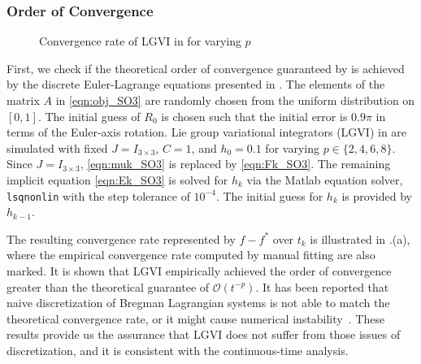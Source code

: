 \documentclass[letterpaper, 10pt, conference]{ieeeconf}
\newcommand{\bracket}[1]{\ensuremath{\left[ #1 \right]}}
\newcommand{\tr}[1]{\mbox{tr}\ensuremath{\negthickspace\bracket{#1}}}
\renewcommand{\L}{\ensuremath{\mathsf{L}}}
\renewcommand{\Re}{\ensuremath{\mathbb{R}}}
\newcommand{\D}{\ensuremath{\mathbf{D}}}
\begin{document}

\subsubsection{Order of Convergence}

\begin{figure}
    \centerline{
    }
    \centerline{
    }
    \caption{Convergence rate of LGVI in  for varying $p$}\label{fig:conv}
\end{figure}

First, we check if the theoretical order of convergence guaranteed by  is achieved by the discrete Euler-Lagrange equations presented in .
The elements of the matrix $A$ in \eqref{eqn:obj_SO3} are randomly chosen from the uniform distribution on $[0,1]$.
The initial guess of $R_0$ is chosen such that the initial error is $0.9\pi$ in terms of the Euler-axis rotation. 
Lie group variational integrators (LGVI) in  are simulated with fixed $J=I_{3\times 3}$, $C=1$, and $h_0 = 0.1$ for varying $p\in\{2,4,6,8\}$. 
Since $J=I_{3\times 3}$, \eqref{eqn:muk_SO3} is replaced by \eqref{eqn:Fk_SO3}.
The remaining implicit equation \eqref{eqn:Ek_SO3} is solved for $h_k$ via the Matlab equation solver, \texttt{lsqnonlin} with the step tolerance of $10^{-4}$.
The initial guess for $h_k$ is provided by $h_{k-1}$. 

The resulting convergence rate represented by $f-f^*$ over $t_k$ is illustrated in .(a), where the empirical convergence rate computed by manual fitting are also marked. 
It is shown that LGVI empirically achieved the order of convergence greater than the theoretical guarantee of $\mathcal{O}(t^{-p})$.
It has been reported that naive discretization of Bregman Lagrangian systems is not able to match the theoretical convergence rate, or it might cause numerical instability~\cite{wibisono2016variational,betancourt2018symplectic}.
These results provide us the assurance that LGVI does not suffer from those issues of discretization, and it is consistent with the continuous-time analysis. 
\end{document}
